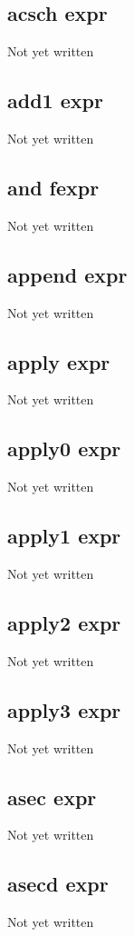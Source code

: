 \documentclass[a4paper,11pt]{article}
\begin{document}
{\subsection{\ttfamily acsch expr}
Not yet written

\subsection{\ttfamily add1 expr}
Not yet written

\subsection{\ttfamily and fexpr}
Not yet written

\subsection{\ttfamily append expr}
Not yet written

\subsection{\ttfamily apply expr}
Not yet written

\subsection{\ttfamily apply0 expr}
Not yet written

\subsection{\ttfamily apply1 expr}
Not yet written

\subsection{\ttfamily apply2 expr}
Not yet written

\subsection{\ttfamily apply3 expr}
Not yet written

\subsection{\ttfamily asec expr}
Not yet written

\subsection{\ttfamily asecd expr}
Not yet written

}
\end{document}

